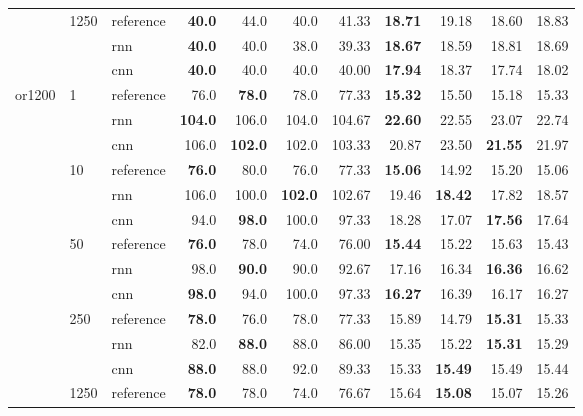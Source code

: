 \begin{table}
{\begin{tabular}{lllrrrrrrrr}
	& 1250 & reference &          \textbf{40.0} &   44.0 &   40.0 &   41.33 &         \textbf{18.71} &  19.18 &  18.60 &  18.83 \\
	&      & rnn &          \textbf{40.0} &   40.0 &   38.0 &   39.33 &         \textbf{18.67} &  18.59 &  18.81 &  18.69 \\
	&      & cnn &          \textbf{40.0} &   40.0 &   40.0 &   40.00 &         \textbf{17.94} &  18.37 &  17.74 &  18.02 \\
	or1200 & 1    & reference &          76.0 &   \textbf{78.0} &   78.0 &   77.33 &         \textbf{15.32} &  15.50 &  15.18 &  15.33 \\
	&      & rnn &         \textbf{104.0} &  106.0 &  104.0 &  104.67 &         \textbf{22.60} &  22.55 &  23.07 &  22.74 \\
	&      & cnn &         106.0 &  \textbf{102.0} &  102.0 &  103.33 &         20.87 &  23.50 &  \textbf{21.55} &  21.97 \\
	& 10   & reference &          \textbf{76.0} &   80.0 &   76.0 &   77.33 &         \textbf{15.06} &  14.92 &  15.20 &  15.06 \\
	&      & rnn &         106.0 &  100.0 &  \textbf{102.0} &  102.67 &         19.46 &  \textbf{18.42} &  17.82 &  18.57 \\
	&      & cnn &          94.0 &   \textbf{98.0} &  100.0 &   97.33 &         18.28 &  17.07 &  \textbf{17.56} &  17.64 \\
	& 50   & reference &          \textbf{76.0} &   78.0 &   74.0 &   76.00 &         \textbf{15.44} &  15.22 &  15.63 &  15.43 \\
	&      & rnn &          98.0 &   \textbf{90.0} &   90.0 &   92.67 &         17.16 &  16.34 &  \textbf{16.36} &  16.62 \\
	&      & cnn &          \textbf{98.0} &   94.0 &  100.0 &   97.33 &         \textbf{16.27} &  16.39 &  16.17 &  16.27 \\
	& 250  & reference &          \textbf{78.0} &   76.0 &   78.0 &   77.33 &         15.89 &  14.79 &  \textbf{15.31} &  15.33 \\
	&      & rnn &          82.0 &   \textbf{88.0} &   88.0 &   86.00 &         15.35 &  15.22 &  \textbf{15.31} &  15.29 \\
	&      & cnn &          \textbf{88.0} &   88.0 &   92.0 &   89.33 &         15.33 &  \textbf{15.49} &  15.49 &  15.44 \\
	& 1250 & reference &          \textbf{78.0} &   78.0 &   74.0 &   76.67 &         15.64 &  \textbf{15.08} &  15.07 &  15.26 \\

\end{tabular}}
\end{table}

